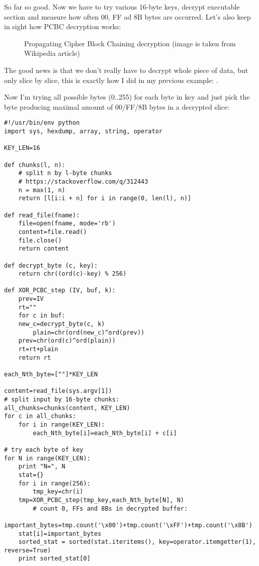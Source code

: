 So far so good. Now we have to try various 16-byte keys, decrypt executable section and measure how often 00, FF ad 8B bytes are occurred.
Let's also keep in sight how PCBC decryption works:

\begin{figure}[H]
\centering
{}
\caption{Propagating Cipher Block Chaining decryption (image is taken from Wikipedia article)}
\end{figure}

The good news is that we don't really have to decrypt whole piece of data, but only slice by slice, this is exactly how I did in my previous example: .

Now I'm trying all possible bytes (0..255) for each byte in key and just pick the byte producing maximal amount of 00/FF/8B bytes in a decrypted slice:

\begin{lstlisting}[style=custompy]
#!/usr/bin/env python
import sys, hexdump, array, string, operator

KEY_LEN=16

def chunks(l, n):
    # split n by l-byte chunks
    # https://stackoverflow.com/q/312443
    n = max(1, n)
    return [l[i:i + n] for i in range(0, len(l), n)]

def read_file(fname):
    file=open(fname, mode='rb')
    content=file.read()
    file.close()
    return content

def decrypt_byte (c, key):
    return chr((ord(c)-key) % 256)

def XOR_PCBC_step (IV, buf, k):
    prev=IV
    rt=""
    for c in buf:
	new_c=decrypt_byte(c, k)
        plain=chr(ord(new_c)^ord(prev))
	prev=chr(ord(c)^ord(plain))
	rt=rt+plain
    return rt

each_Nth_byte=[""]*KEY_LEN

content=read_file(sys.argv[1])
# split input by 16-byte chunks:
all_chunks=chunks(content, KEY_LEN)
for c in all_chunks:
    for i in range(KEY_LEN):
        each_Nth_byte[i]=each_Nth_byte[i] + c[i]

# try each byte of key
for N in range(KEY_LEN):
    print "N=", N
    stat={}
    for i in range(256):
        tmp_key=chr(i)
	tmp=XOR_PCBC_step(tmp_key,each_Nth_byte[N], N)
        # count 0, FFs and 8Bs in decrypted buffer:
	important_bytes=tmp.count('\x00')+tmp.count('\xFF')+tmp.count('\x8B')
	stat[i]=important_bytes
    sorted_stat = sorted(stat.iteritems(), key=operator.itemgetter(1), reverse=True)
    print sorted_stat[0]
\end{lstlisting}

